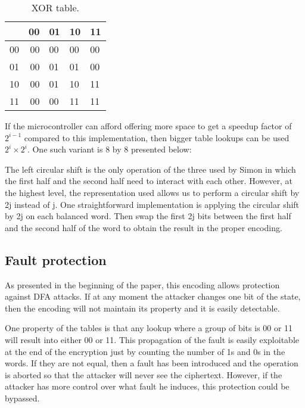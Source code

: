\documentclass[conference]{IEEEtran}
\newcounter{todocnt}
\newcommand{\todo}[1]{\stepcounter{todocnt}{\tt {[#1]}} \marginpar{{$\blacksquare$ \thetodocnt}}}
\begin{document}
\begin{table}[htbp]
  \renewcommand{\arraystretch}{1.3}
  \caption{XOR table.}
  \vspace{0.05 in}
  \label{tab:and2}
  \centering
  \begin{tabular}{r|rllp{0.5in}}
    ~ & 00 & 01 & 10 & 11 \\ \hline
    00 & 00 & 00 & 00 & 00 \\
    01 & 00 & 01 & 01 & 00 \\
    10 & 00 & 01 & 10 & 11 \\
    11 & 00 & 00 & 11 & 11 \\
  \end{tabular}
\end{table}

If the microcontroller can afford offering more space to get a speedup factor of $2^{i-1}$ compared to this implementation, then bigger table lookups can be used $2^{i} \times 2^{i}$. One such variant is 8 by 8 presented below:

\todo{8 by 8 XOR, and 8 by 8 AND}


The left circular shift is the only operation of the three used by Simon in which the first half and the second half need to interact with each other. However, at the highest level, the representation used allows us to perform a circular shift by 2j instead of j. One straightforward implementation is applying the circular shift by 2j on each balanced word. Then swap the first 2j bits between the first half and the second half of the word to obtain the result in the proper encoding. 

\subsection{Fault protection}

As presented in the beginning of the paper, this encoding allows protection against DFA attacks. If at any moment the attacker changes one bit of the state, then the encoding will not maintain its property and it is easily detectable.

One property of the tables is that any lookup where a group of bits is 00 or 11 will result into either 00 or 11. This propagation of the fault is easily exploitable at the end of the encryption just by counting the number of 1s and 0s in the words. If they are not equal, then a fault has been introduced and the operation is aborted so that the attacker will never see the ciphertext. However, if the attacker has more control over what fault he induces, this protection could be bypassed.
\end{document}
